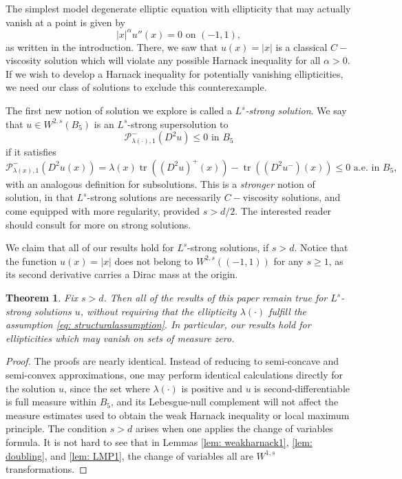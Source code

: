 \documentclass[reqno]{amsart}
\numberwithin{equation}{section}
\newtheorem{thm}{Theorem}[section]
\numberwithin{equation}{section}
\DeclareMathOperator{\tr}{tr}
\begin{document}
The simplest model degenerate elliptic equation with ellipticity that may actually vanish at a point is given by 
\begin{equation}
    \label{eq: toymodel}
    |x|^\alpha u''(x) =0 \text{ on } (-1,1),
\end{equation}
as written in the introduction. There, we saw that $u(x) = |x|$ is a classical $C-$viscosity solution which will violate any possible Harnack inequality for all $\alpha>0$. If we wish to develop a Harnack inequality for potentially vanishing ellipticities, we need our class of solutions to exclude this counterexample. 

The first new notion of solution we explore is called a \textit{$L^s$-strong solution}. We say that $u \in W^{2,s}(B_5)$ is an $L^s$-strong supersolution to
$$\mathcal{P}^-_{\lambda(\cdot),1}(D^2u) \le 0 \text{ in } B_5$$
if it satisfies
$$\mathcal{P}^-_{\lambda(x),1}(D^2u(x))= \lambda(x) \tr((D^2u)^+(x)) - \tr((D^2u^-)(x))\le 0 \text{ a.e.  in }B_5,$$
with an analogous definition for subsolutions. This is a \textit{stronger} notion of solution, in that $L^s$-strong solutions are necessarily $C-$viscosity solutions, and come equipped with more regularity, provided $s>d/2$. The interested reader should consult \cite{GilbargTrudinger2001} for more on strong solutions. 


We claim that all of our results hold for $L^s$-strong solutions, if $s>d$. Notice that the function $u(x) =|x|$ does not belong to $W^{2,s}((-1,1))$ for any $s\ge 1$, as its second derivative carries a Dirac mass at the origin. 

\begin{thm}
    Fix $s>d$. Then all of the results of this paper remain true for $L^s$-strong solutions $u$, without requiring that the ellipticity $\lambda(\cdot)$ fulfill the assumption \eqref{eq: structuralassumption}. In particular, our results hold for ellipticities which may vanish on sets of measure zero. 
\end{thm}
\begin{proof}
    The proofs are nearly identical. Instead of reducing to semi-concave and semi-convex approximations, one may perform identical calculations directly for the solution $u$, since the set where $\lambda(\cdot)$ is positive and $u$ is second-differentiable is full measure within $B_5$, and its Lebesgue-null complement will not affect the measure estimates used to obtain the weak Harnack inequality or local maximum principle. The condition $s>d$ arises when one applies the change of variables formula. It is not hard to see that in Lemmas \ref{lem: weakharnack1}, \ref{lem: doubling}, and \ref{lem: LMP1}, the change of variables all are $W^{1,s}$ transformations. 
\end{proof}
\end{document}
